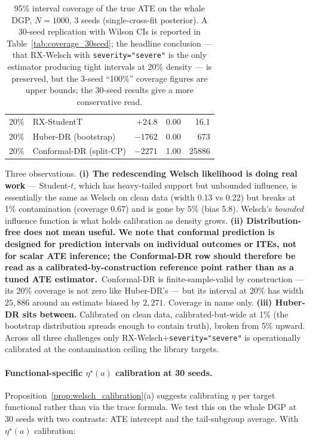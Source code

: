 \begin{table}[!t]
\begin{tabular}{rlrrr}
20\%  & RX-StudentT                    & $+24.8$    & 0.00 & 16.1 \\
20\%  & Huber-DR (bootstrap)           & $-1762$    & 0.00 & 673 \\
20\%  & Conformal-DR (split-CP)        & $-2271$    & 1.00 & 25886 \\
\bottomrule
\end{tabular}
\caption{95\% interval coverage of the true ATE on the whale DGP,
$N = 1000$, 3 seeds (single-cross-fit posterior). A 30-seed
replication with Wilson CIs is reported in
Table~\ref{tab:coverage_30seed}; the headline conclusion --- that
RX-Welsch with \texttt{severity="severe"} is the only estimator
producing tight intervals at 20\% density --- is preserved, but
the 3-seed ``100\%'' coverage figures are upper bounds; the 30-seed
results give a more conservative read.}
\label{tab:coverage}
\end{table}

Three observations. \textbf{(i) The redescending Welsch likelihood
is doing real work} --- Student-$t$, which has heavy-tailed support
but unbounded influence, is essentially the same as Welsch on clean
data (width 0.13 vs 0.22) but breaks at 1\% contamination
(coverage 0.67) and is gone by 5\% (bias 5.8). Welsch's
\emph{bounded} influence function is what holds calibration as
density grows. \textbf{(ii) Distribution-free does not mean
useful. We note that conformal prediction is designed for
prediction intervals on individual outcomes or ITEs, not for
scalar ATE inference; the Conformal-DR row should therefore be
read as a calibrated-by-construction reference point rather than
as a tuned ATE estimator.}~Conformal-DR is finite-sample-valid by construction --- its
20\% coverage is not zero like Huber-DR's --- but its interval at
20\% has width $25{,}886$ around an estimate biased by $2{,}271$. Coverage
in name only. \textbf{(iii) Huber-DR sits between.} Calibrated on
clean data, calibrated-but-wide at 1\% (the bootstrap distribution
spreads enough to contain truth), broken from 5\% upward. Across
all three challenges only RX-Welsch+\texttt{severity="severe"} is operationally
calibrated at the contamination ceiling the library targets.

\paragraph{Functional-specific $\eta^\star(a)$ calibration at 30 seeds.}
Proposition~\ref{prop:welsch_calibration}(a) suggests calibrating $\eta$
per target functional rather than via the trace formula. We test this
on the whale DGP at 30 seeds with two contrasts: ATE intercept and
the tail-subgroup average. With $\eta^\star(a)$ calibration:

